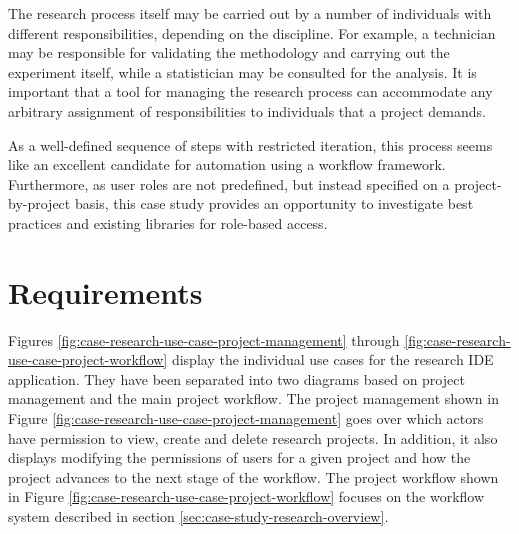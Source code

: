 \documentclass[document.tex]{subfiles}
\begin{document}
The research process itself may be carried out by a number of individuals with different responsibilities, depending on the discipline. For example, a technician may be responsible for validating the methodology and carrying out the experiment itself, while a statistician may be consulted for the analysis. It is important that a tool for managing the research process can accommodate any arbitrary assignment of responsibilities to individuals that a project demands.

As a well-defined sequence of steps with restricted iteration, this process seems like an excellent candidate for automation using a workflow framework. Furthermore, as user roles are not predefined, but instead specified on a project-by-project basis, this case study provides an opportunity to investigate best practices and existing libraries for role-based access.



\section {Requirements}
\label{sec:case-research-requirements}

  Figures \ref{fig:case-research-use-case-project-management} through \ref{fig:case-research-use-case-project-workflow} display the individual use cases for the research IDE application. They have been separated into two diagrams based on project management and the main project workflow. The project management shown in Figure \ref{fig:case-research-use-case-project-management} goes over which actors have permission to view, create and delete research projects. In addition, it also displays modifying the permissions of users for a given project and how the project advances to the next stage of the workflow. The project workflow shown in Figure \ref{fig:case-research-use-case-project-workflow} focuses on the workflow system described in section \ref{sec:case-study-research-overview}.
\end{document}
